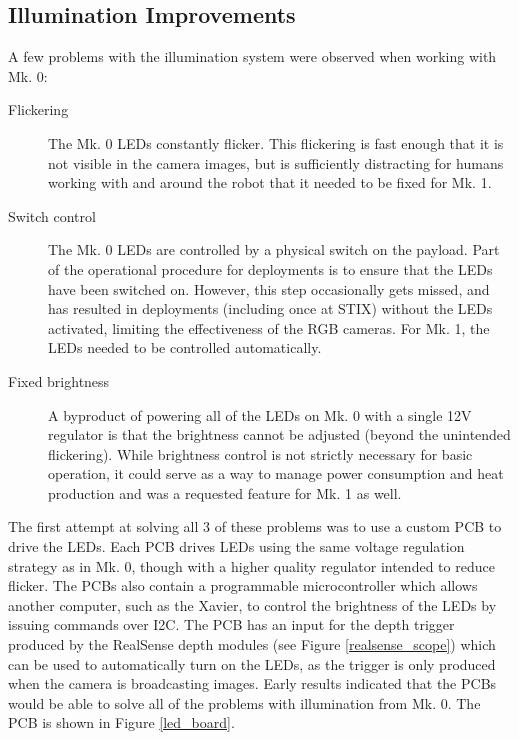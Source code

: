 \subsection{Illumination Improvements}

A few problems with the illumination system were observed when working with Mk. 0:

\begin{description}
	\item[Flickering] The Mk. 0 LEDs constantly flicker. This flickering is fast enough that it is not visible in the camera images, but is sufficiently distracting for humans working with and around the robot that it needed to be fixed for Mk. 1.
	\item[Switch control] The Mk. 0 LEDs are controlled by a physical switch on the payload. Part of the operational procedure for deployments is to ensure that the LEDs have been switched on. However, this step occasionally gets missed, and has resulted in deployments (including once at STIX) without the LEDs activated, limiting the effectiveness of the RGB cameras. For Mk. 1, the LEDs needed to be controlled automatically.
	\item[Fixed brightness] A byproduct of powering all of the LEDs on Mk. 0 with a single 12V regulator is that the brightness cannot be adjusted (beyond the unintended flickering). While brightness control is not strictly necessary for basic operation, it could serve as a way to manage power consumption and heat production and was a requested feature for Mk. 1 as well.
\end{description}

The first attempt at solving all 3 of these problems was to use a custom PCB to drive the LEDs. Each PCB drives LEDs using the same voltage regulation strategy as in Mk. 0, though with a higher quality regulator intended to reduce flicker. The PCBs also contain a programmable microcontroller which allows another computer, such as the Xavier, to control the brightness of the LEDs by issuing commands over I2C. The PCB has an input for the depth trigger produced by the RealSense depth modules (see Figure \ref{realsense_scope}) which can be used to automatically turn on the LEDs, as the trigger is only produced when the camera is broadcasting images. Early results indicated that the PCBs would be able to solve all of the problems with illumination from  Mk. 0. The PCB is shown in Figure \ref{led_board}.

